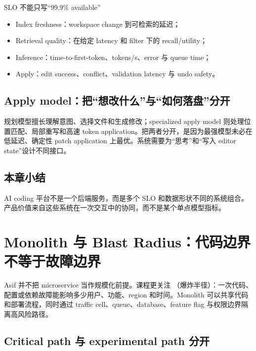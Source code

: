 \documentclass[a4paper]{article}
\begin{document}
\begin{importantbox}{SLO 不能只写“99.9\% available”}
\begin{itemize}
  \item Index freshness：workspace change 到可检索的延迟；
  \item Retrieval quality：在给定 latency 和 filter 下的 recall/utility；
  \item Inference：time-to-first-token、tokens/s、error 与 queue time；
  \item Apply：edit success、conflict、validation latency 与 undo safety。
\end{itemize}
\end{importantbox}

\subsection{Apply model：把“想改什么”与“如何落盘”分开}

规划模型擅长理解意图、选择文件和生成修改；specialized apply model 则处理位置匹配、局部重写和高速 token application。把两者分开，是因为最强模型未必在低延迟、确定性 patch application 上最优。系统需要为“思考”和“写入 editor state”设计不同接口。


\subsection{本章小结}

AI coding 平台不是一个后端服务，而是多个 SLO 和数据形状不同的系统组合。产品价值来自这些系统在一次交互中的协同，而不是某个单点模型指标。

\section{Monolith 与 Blast Radius：代码边界不等于故障边界}

Asif 并不把 microservice 当作规模化前提。课程更关注 （爆炸半径）：一次代码、配置或依赖故障能影响多少用户、功能、region 和时间。Monolith 可以共享代码和部署流程，同时通过 traffic cell、queue、database、feature flag 与权限边界隔离高风险路径。

\subsection{Critical path 与 experimental path 分开}
\end{document}
